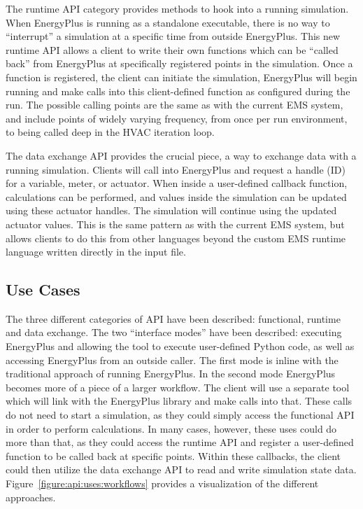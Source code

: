 \documentclass[5p, authoryear]{elsarticle}
\begin{document}
The runtime API category provides methods to hook into a running simulation.  When EnergyPlus is running as a standalone executable, there is no way to “interrupt” a simulation at a specific time from outside EnergyPlus.  This new runtime API allows a client to write their own functions which can be “called back” from EnergyPlus at specifically registered points in the simulation.  Once a function is registered, the client can initiate the simulation, EnergyPlus will begin running and make calls into this client-defined function as configured during the run.  The possible calling points are the same as with the current EMS system, and include points of widely varying frequency, from once per run environment, to being called deep in the HVAC iteration loop.

The data exchange API provides the crucial piece, a way to exchange data with a running simulation.  Clients will call into EnergyPlus and request a handle (ID) for a variable, meter, or actuator.  When inside a user-defined callback function, calculations can be performed, and values inside the simulation can be updated using these actuator handles.  The simulation will continue using the updated actuator values.  This is the same pattern as with the current EMS system, but allows clients to do this from other languages beyond the custom EMS runtime language written directly in the input file.

  \subsection{Use Cases}
The three different categories of API have been described: functional, runtime and data exchange.  The two “interface modes” have been described: executing EnergyPlus and allowing the tool to execute user-defined Python code, as well as accessing EnergyPlus from an outside caller.  The first mode is inline with the traditional approach of running EnergyPlus.  In the second mode EnergyPlus becomes more of a piece of a larger workflow.  The client will use a separate tool which will link with the EnergyPlus library and make calls into that.  These calls do not need to start a simulation, as they could simply access the functional API in order to perform calculations.  In many cases, however, these uses could do more than that, as they could access the runtime API and register a user-defined function to be called back at specific points.  Within these callbacks, the client could then utilize the data exchange API to read and write simulation state data.  Figure~\ref{figure:api:uses:workflows} provides a visualization of the different approaches.
\end{document}
